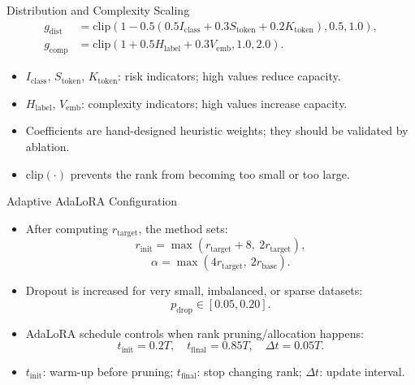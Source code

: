 \begin{frame}{Distribution and Complexity Scaling}
\begin{align*}
  g_{\mathrm{dist}}
  &=
  \mathrm{clip}
  \left(
    1 - 0.5
    \left(
      0.5I_{\mathrm{class}}
      + 0.3S_{\mathrm{token}}
      + 0.2K_{\mathrm{token}}
    \right),
    0.5, 1.0
  \right), \\
  g_{\mathrm{comp}}
  &=
  \mathrm{clip}
  \left(
    1
    + 0.5H_{\mathrm{label}}
    + 0.3V_{\mathrm{emb}},
    1.0, 2.0
  \right).
\end{align*}

\vspace{4pt}
\begin{itemize}
  \item \(I_{\mathrm{class}}\), \(S_{\mathrm{token}}\), \(K_{\mathrm{token}}\): risk indicators; high values reduce capacity.
  \item \(H_{\mathrm{label}}\), \(V_{\mathrm{emb}}\): complexity indicators; high values increase capacity.
  \item Coefficients are hand-designed heuristic weights; they should be validated by ablation.
  \item \(\mathrm{clip}(\cdot)\) prevents the rank from becoming too small or too large.
\end{itemize}
\end{frame}

\begin{frame}{Adaptive AdaLoRA Configuration}
\begin{itemize}
  \item After computing \(r_{\mathrm{target}}\), the method sets:
  \[
    r_{\mathrm{init}} = \max(r_{\mathrm{target}} + 8,\ 2r_{\mathrm{target}}),
  \]
  \[
    \alpha = \max(4r_{\mathrm{target}},\ 2r_{\mathrm{base}}).
  \]
  \item Dropout is increased for very small, imbalanced, or sparse datasets:
  \[
    p_{\mathrm{drop}} \in [0.05, 0.20].
  \]
  \item AdaLoRA schedule controls when rank pruning/allocation happens:
  \[
    t_{\mathrm{init}}=0.2T,\quad
    t_{\mathrm{final}}=0.85T,\quad
    \Delta t=0.05T.
  \]
  \item \(t_{\mathrm{init}}\): warm-up before pruning; \(t_{\mathrm{final}}\): stop changing rank; \(\Delta t\): update interval.
\end{itemize}
\end{frame}


